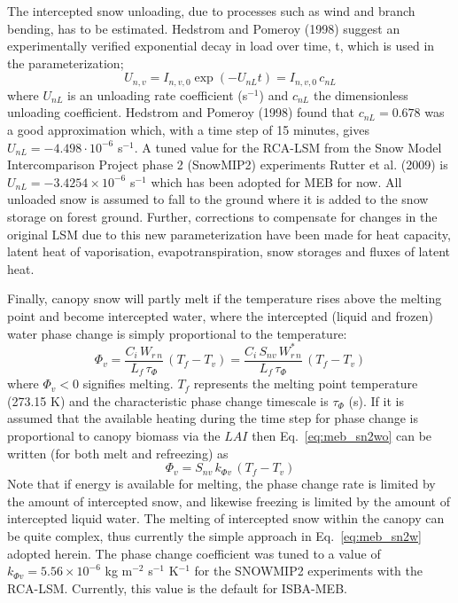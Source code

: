 The intercepted snow unloading, due to processes such as wind and branch
bending, has to be estimated.
Hedstrom and Pomeroy (1998)\nocite{Hedstrom98} 
suggest 
an experimentally verified exponential decay in load over time, t,
which is used in the parameterization;
%
\begin{equation}
  \label{eq:meb_rd_snowcanunl}
  U_{n,v} = I_{n,v,0}\exp( -U_{nL} t ) =  I_{n,v,0} \, c_{nL}
\end{equation}
%
where $U_{nL}$ is an unloading rate coefficient (s$^{-1}$) and
$c_{nL}$ the dimensionless unloading
coefficient. 
Hedstrom and Pomeroy (1998)\nocite{Hedstrom98} 
found that $c_{nL} = 0.678$ was a good approximation which, with a
time step of 15 minutes, gives $U_{nL} = -4.498 \cdot 10^{-6}$ s$^{-1}$. A 
tuned 
value for the RCA-LSM
from the Snow Model Intercomparison Project phase 2 (SnowMIP2) 
experiments 
Rutter et al. (2009)\nocite{rutter_evaluation_2009}
is $U_{nL} = -3.4254 \times 10^{-6}$ s$^{-1}$ which has been adopted
for MEB for now.
All unloaded snow is assumed to fall to the ground where it
is added to the snow storage on forest ground.
%
Further, corrections to compensate for changes in the original LSM due
to this new parameterization have been made for heat capacity, 
latent heat of vaporisation, evapotranspiration, snow storages and
fluxes of latent heat.


Finally, canopy snow will partly melt if the temperature rises
above the melting point and become intercepted water, where the intercepted
(liquid and frozen) 
water phase change is simply proportional to the temperature:
%
\begin{equation}
  \label{eq:meb_sn2wo}
   \Phi_{v} = 
{\frac{C_i \, W_{r\,n}}{L_f\,\tau_\Phi}} \,\left(T_f-T_v\right) = 
{\frac{C_i \, S_{nv} \, W_{r\,n}^\ast}{L_f\,\tau_\Phi}} \,\left(T_f-T_v\right) 
\end{equation}
%
where $\Phi_{v}<0$ signifies melting.
$T_f$ represents the melting point temperature (273.15 K)
and the characteristic phase change timescale is $\tau_\Phi$ (s).
If it is assumed that the available heating during the time step
for phase change
is proportional to canopy biomass via the $LAI$
then Eq.~\ref{eq:meb_sn2wo} can be written (for both melt and
refreezing) as
%
\begin{equation}
  \label{eq:meb_sn2w}
   \Phi_{v} = S_{nv}\,k_{\Phi v}\,\left(T_f-T_v\right)
\end{equation}
%
Note that if energy is available for melting, the phase change rate is
limited by the amount of intercepted snow, and likewise freezing is
limited by the amount of intercepted liquid water.
%
The melting of intercepted snow within the canopy can be quite
complex, thus currently the simple approach in Eq.~\ref{eq:meb_sn2w} adopted herein.
The phase change coefficient was tuned to a value of $k_{\Phi v}= 5.56\times 10^{-6}$ 
kg m$^{-2}$ s$^{-1}$ K$^{-1}$ for the SNOWMIP2 experiments with the
RCA-LSM. Currently, this value is the default for ISBA-MEB.


